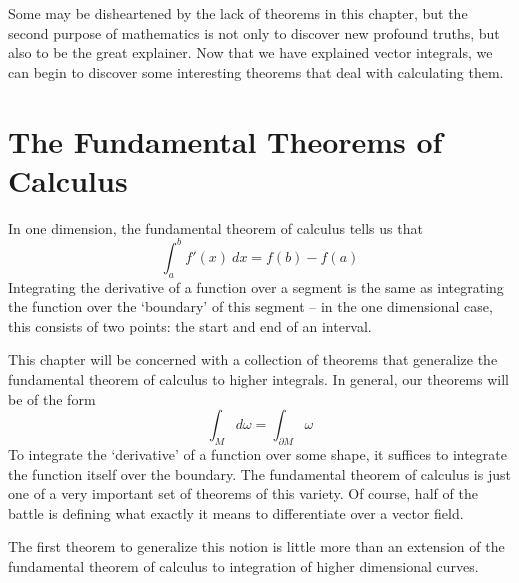 \documentclass[12pt]{amsbook}
\theoremstyle{plain}
\theoremstyle{definition}
\begin{document}
Some may be disheartened by the lack of theorems in this chapter, but the second purpose of mathematics is not only to discover new profound truths, but also to be the great explainer. Now that we have explained vector integrals, we can begin to discover some interesting theorems that deal with calculating them.





\section{The Fundamental Theorems of Calculus}

In one dimension, the fundamental theorem of calculus tells us that
%
\[ \int_a^b f'(x)\ dx = f(b) - f(a) \]
%
Integrating the derivative of a function over a segment is the same as integrating the function over the `boundary' of this segment -- in the one dimensional case, this consists of two points: the start and end of an interval.

This chapter will be concerned with a collection of theorems that generalize the fundamental theorem of calculus to higher integrals. In general, our theorems will be of the form
%
\[ \int_M d\omega = \int_{\partial M} \omega \]
%
To integrate the `derivative' of a function over some shape, it suffices to integrate the function itself over the boundary. The fundamental theorem of calculus is just one of a very important set of theorems of this variety. Of course, half of the battle is defining what exactly it means to differentiate over a vector field.

The first theorem to generalize this notion is little more than an extension of the fundamental theorem of calculus to integration of higher dimensional curves.
\end{document}

